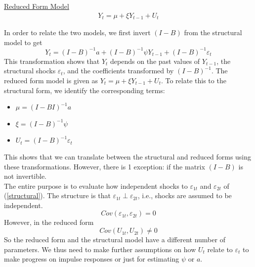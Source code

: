 \underline{Reduced Form Model}
\begin{align*}
    Y_t=\mu + \xi Y_{t-1} + U_t
\end{align*}


In order to relate the two models, we first invert $(I-B)$ from the structural model to get \[
Y_t = (I-B)^{-1} a + (I-B)^{-1} \psi Y_{t-1}+ (I-B)^{-1}\varepsilon_t
\]
This transformation shows that $Y_t$ depends on the past values of $Y_{t-1}$, the structural shocks $\varepsilon_t$, and the coefficients transformed by $(I-B)^{-1}$. The reduced form model is given as $Y_t = \mu + \xi Y_{t-1} + U_t$. To relate this to the structural form, we identify the corresponding terms:
\begin{itemize}
    \item $\mu = (I-BI)^{-1} a$
    \item $\xi = (I-B)^{-1} \psi$
    \item $U_t = (I-B)^{-1} \varepsilon_t$
\end{itemize}

This shows that we can translate between the structural and reduced forms using these transformations. However, there is 1 exception: if the matrix $(I-B)$ is not invertible. \\

The entire purpose is to evaluate how independent shocks to $\varepsilon_{1t}$ and $\varepsilon_{2t}$ of (\ref{structural}). The structure is that $\varepsilon_{1t} \perp \varepsilon_{2t}$, i.e., shocks are assumed to be independent. \[
Cov(\varepsilon_{1t}, \varepsilon_{2t}) = 0
\]
However, in the reduced form \[
Cov(U_{1t},U_{2t})\neq 0
\] So the reduced form and the structural model have a different number of parameters. We thus need to make further assumptions on how $U_t$ relate to $\varepsilon_t$ to make progress on impulse responses or just for estimating $\psi$ or $a$.\\

